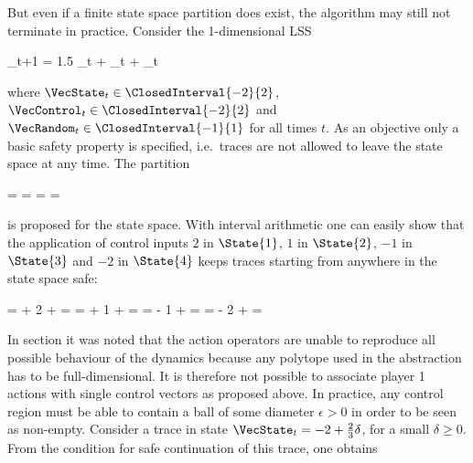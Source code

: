     But even if a finite state space partition does exist, the algorithm may still not terminate in practice.
    Consider the 1-dimensional LSS

    \startformula
        \VecState_{t+1} = 1.5 \VecState_t + \VecControl_t + \VecRandom_t \EndComma
    \stopformula

    where $\VecState_t \in \ClosedInterval{-2}{2}$, $\VecControl_t \in \ClosedInterval{-2}{2}$ and $\VecRandom_t \in \ClosedInterval{-1}{1}$ for all times $t$.
    As an objective only a basic safety property is specified, i.e.\ traces are not allowed to leave the state space at any time.
    The partition

    \startformula
         =  \MidComma {} =  \MidComma {} =  \MidComma {} = 
    \stopformula

    is proposed for the state space.
    With interval arithmetic one can easily show that the application of control inputs $2$ in $\State{1}$, $1$ in $\State{2}$, $-1$ in $\State{3}$ and $-2$ in $\State{4}$ keeps traces starting from anywhere in the state space safe:

    \startformula
        \startalign[n=4,align={right,middle,left,left}]
            \NC {} =
             \cdot {} + 2 + 
            \NC = 
            \NC \subseteq \StateSpace \EndComma
            \NR
            \NC {} =
             \cdot {} + 1 + 
            \NC = 
            \NC \subseteq \StateSpace \EndComma
            \NR
            \NC {} =
             \cdot {} - 1 + 
            \NC = 
            \NC \subseteq \StateSpace \EndComma
            \NR
            \NC {} =
             \cdot {} - 2 + 
            \NC = 
            \NC \subseteq \StateSpace \EndPeriod
            \NR
        \stopalign
    \stopformula

    In section  it was noted that the action operators are unable to reproduce all possible behaviour of the dynamics because any polytope used in the abstraction has to be full-dimensional.
    It is therefore not possible to associate player 1 actions with single control vectors as proposed above.
    In practice, any control region must be able to contain a ball of some diameter $\epsilon > 0$ in order to be seen as non-empty.
    Consider a trace in state $\VecState_t = -2 + \frac{2}{3} \delta$, for a small $\delta \ge 0$.
    From the condition for safe continuation of this trace, one obtains

